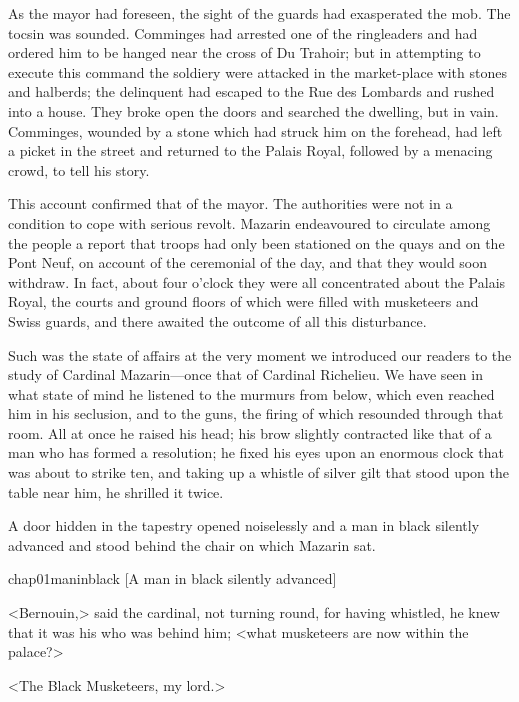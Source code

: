 As the mayor had foreseen, the sight of the guards had exasperated the mob. The tocsin was sounded. Comminges had arrested one of the ringleaders and had ordered him to be hanged near the cross of Du Trahoir; but in attempting to execute this command the soldiery were attacked in the market-place with stones and halberds; the delinquent had escaped to the Rue des Lombards and rushed into a house. They broke open the doors and searched the dwelling, but in vain. Comminges, wounded by a stone which had struck him on the forehead, had left a picket in the street and returned to the Palais Royal, followed by a menacing crowd, to tell his story.

This account confirmed that of the mayor. The authorities were not in a condition to cope with serious revolt. Mazarin endeavoured to circulate among the people a report that troops had only been stationed on the quays and on the Pont Neuf, on account of the ceremonial of the day, and that they would soon withdraw. In fact, about four o'clock they were all concentrated about the Palais Royal, the courts and ground floors of which were filled with musketeers and Swiss guards, and there awaited the outcome of all this disturbance.

Such was the state of affairs at the very moment we introduced our readers to the study of Cardinal Mazarin—once that of Cardinal Richelieu. We have seen in what state of mind he listened to the murmurs from below, which even reached him in his seclusion, and to the guns, the firing of which resounded through that room. All at once he raised his head; his brow slightly contracted like that of a man who has formed a resolution; he fixed his eyes upon an enormous clock that was about to strike ten, and taking up a whistle of silver gilt that stood upon the table near him, he shrilled it twice.

A door hidden in the tapestry opened noiselessly and a man in black silently advanced and stood behind the chair on which Mazarin sat.

\begin{bwbigpic}
	[\basicscale] 
	{chap01maninblack}
	[A man in black silently advanced]
\end{bwbigpic}

<Bernouin,> said the cardinal, not turning round, for having whistled, he knew that it was his  who was behind him; <what musketeers are now within the palace?>

<The Black Musketeers, my lord.>

